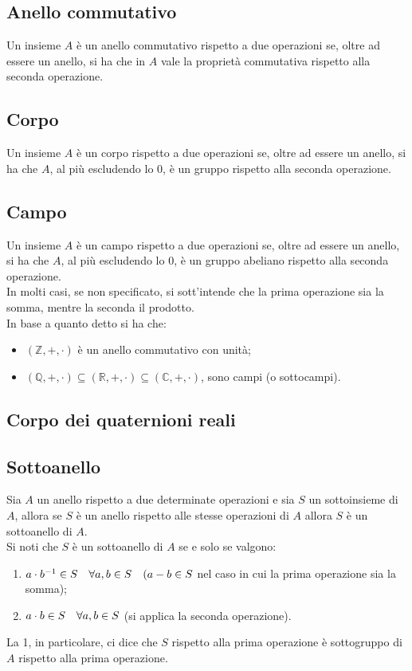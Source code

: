 \begin{flushleft}
\subsection{Anello commutativo}
Un insieme $A$ è un anello commutativo rispetto a due operazioni se, oltre ad essere un anello, si ha che in $A$ vale la proprietà commutativa rispetto alla seconda operazione.

\subsection{Corpo}
Un insieme $A$ è un corpo rispetto a due operazioni se, oltre ad essere un anello, si ha che $A$, al più escludendo lo 0, è un gruppo rispetto alla seconda operazione.

\subsection{Campo}
Un insieme $A$ è un campo rispetto a due operazioni se, oltre ad essere un anello, si ha che $A$, al più escludendo lo 0, è un gruppo abeliano rispetto alla seconda operazione.\\
In molti casi, se non specificato, si sott'intende che la prima operazione sia la somma, mentre la seconda il prodotto.\\
In base a quanto detto si ha che:
\begin{itemize}
    \item $(\mathbb{Z}, +,\cdot)$ è un anello commutativo con unità;
    \item $(\mathbb{Q}, +,\cdot) \subseteq(\mathbb{R}, +,\cdot) \subseteq(\mathbb{C}, +,\cdot)$, sono campi (o sottocampi).
\end{itemize}

\subsection{Corpo dei quaternioni reali}


\subsection{Sottoanello}
Sia $A$ un anello rispetto a due determinate operazioni e sia $S$ un sottoinsieme di $A$, allora se $S$ è un anello rispetto alle stesse operazioni di $A$ allora $S$ è un sottoanello di $A$.\\
Si noti che $S$ è un sottoanello di $A$ se e solo se valgono:
\begin{enumerate}
    \item $a \cdot b^{-1}\in S\hspace{10px}\forall a,b\in S\hspace{10px}(a-b\in S$ nel caso in cui la prima operazione sia la somma);
    \item $a\cdot b\in S\hspace{10px}\forall a,b \in S$ (si applica la seconda operazione).
\end{enumerate}
La 1, in particolare, ci dice che $S$ rispetto alla prima operazione è sottogruppo di $A$ rispetto alla prima operazione.



\end{flushleft}
